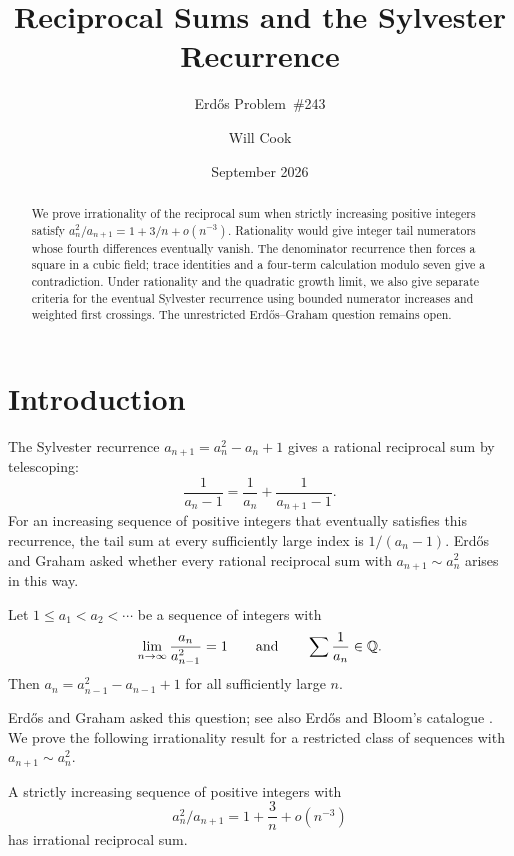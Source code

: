 \documentclass[11pt]{article}
\title{Reciprocal Sums and the Sylvester Recurrence}
\subtitle{Erd\H{o}s Problem~\#243}
\author{Will Cook}
\date{September 2026}
\begin{document}
\maketitle
\noteprovenance

\begin{abstract}
We prove irrationality of the reciprocal sum when strictly increasing
positive integers satisfy $a_n^2/a_{n+1}=1+3/n+o(n^{-3})$.
Rationality would give integer tail numerators whose fourth differences
eventually vanish. The denominator recurrence then forces a square in a
cubic field; trace identities and a four-term calculation modulo seven
give a contradiction. Under rationality and the quadratic growth limit,
we also give separate criteria for the eventual Sylvester recurrence
using bounded numerator increases and weighted first crossings. The unrestricted Erd\H{o}s--Graham question remains open.
\end{abstract}

\section{Introduction}\label{sec:problem}
The Sylvester recurrence $a_{n+1}=a_n^2-a_n+1$ gives a rational
reciprocal sum by telescoping:
\[
 \frac1{a_n-1}=\frac1{a_n}+\frac1{a_{n+1}-1}.
\]
For an increasing sequence of positive integers that eventually satisfies
this recurrence, the tail sum at every sufficiently large index is
$1/(a_n-1)$. Erd\H{o}s and Graham asked whether every rational
reciprocal sum with $a_{n+1}\sim a_n^2$ arises in this way.

\begin{problem}\label{res:problem}
Let $1\le a_1<a_2<\cdots$ be a sequence of integers with
\[
 \lim_{n\to\infty}\frac{a_n}{a_{n-1}^{2}}=1
 \qquad\text{and}\qquad
 \sum\frac{1}{a_n}\in\mathbb{Q} .
\]
Then $a_n=a_{n-1}^{2}-a_{n-1}+1$ for all sufficiently large $n$.
\end{problem}

Erd\H{o}s and Graham \cite[p.~64]{erdosgraham1980} asked this question;
see also Erd\H{o}s \cite[p.~105]{erdos1988} and Bloom's catalogue
\cite{erdosproblems}. We prove the following irrationality result for a
restricted class of sequences with $a_{n+1}\sim a_n^2$.

\begin{theorem}\label{res:cubicrate}
A strictly increasing sequence of positive integers with
\[
 a_n^2/a_{n+1}=1+\frac3n+o(n^{-3})
\]
has irrational reciprocal sum.
\end{theorem}
\end{document}
